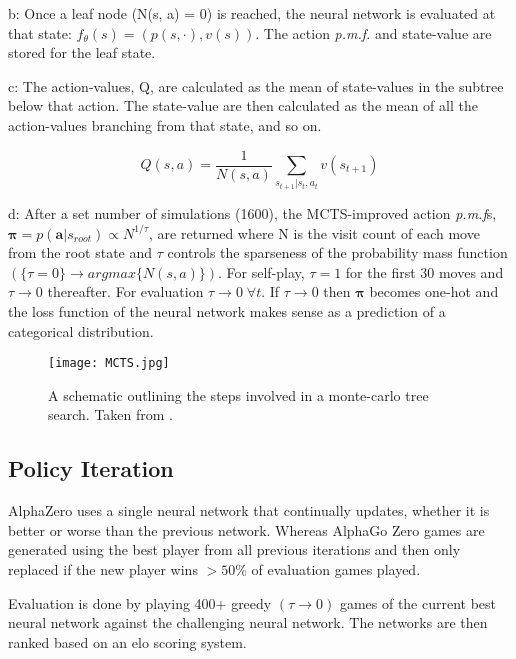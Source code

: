 \documentclass[../main.tex]{subfiles}
\begin{document}
b:
Once a leaf node (N(s, a) = 0) is reached, the neural network is evaluated at that state: $f_\theta (s) = (p(s, \cdot), v(s))$. The action \textit{p.m.f.} and state-value are stored for the leaf state.

c:
The action-values, Q, are calculated as the mean of state-values in the subtree below that action. The state-value are then calculated as the mean of all the action-values branching from that state, and so on.

\begin{equation}
   Q(s, a) = \frac{1}{N(s, a)} \sum_{s_{t+1} | s_t, a_t} v(s_{t+1})
   \label{eqn:actionvalue}
\end{equation} 

d:
After a set number of simulations (1600), the MCTS-improved action \textit{p.m.f}s, $\boldsymbol{\pi} = p(\boldsymbol{a} | s_{root}) \propto N^{1/\tau}$, are returned where N is the visit count of each move from the root state and $\tau$ controls the sparseness of the probability mass function $(\{\tau = 0\} \rightarrow argmax\{N(s, a)\})$. For self-play, $\tau = 1$ for the first 30 moves and $\tau \rightarrow 0$ thereafter. For evaluation $\tau \rightarrow 0 \; \forall t$. If $\tau \rightarrow 0$ then $\boldsymbol{\pi}$ becomes one-hot and the loss function of the neural network makes sense as a prediction of a categorical distribution.

\begin{figure}[H]
   \centering
   \texttt{[image: MCTS.jpg]}
   \caption{\label{fig:MCTS} A schematic outlining the steps involved in a monte-carlo tree search. Taken from \cite{AlphaGoZero}.}
\end{figure}

\subsection{Policy Iteration}

AlphaZero uses a single neural network that continually updates, whether it is better or worse than the previous network. Whereas AlphaGo Zero games are generated using the best player from all previous iterations and then only replaced if the new player wins $> 50\%$ of evaluation games played.

Evaluation is done by playing 400+ greedy $(\tau \rightarrow 0)$ games of the current best neural network against the challenging neural network. The networks are then ranked based on an elo scoring system.
\end{document}

